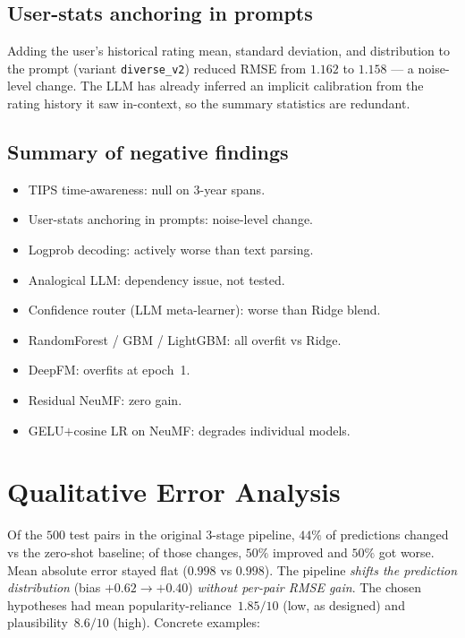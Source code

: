 \documentclass[11pt,a4paper]{article}
\begin{document}
\subsection{User-stats anchoring in prompts}
Adding the user's historical rating mean, standard deviation, and
distribution to the prompt (variant \texttt{diverse\_v2}) reduced RMSE
from $1.162$ to $1.158$ --- a noise-level change. The LLM has already
inferred an implicit calibration from the rating history it saw in-context,
so the summary statistics are redundant.

\subsection{Summary of negative findings}
\begin{itemize}[leftmargin=1.5em,itemsep=1pt]
\item TIPS time-awareness: null on 3-year spans.
\item User-stats anchoring in prompts: noise-level change.
\item Logprob decoding: actively worse than text parsing.
\item Analogical LLM: dependency issue, not tested.
\item Confidence router (LLM meta-learner): worse than Ridge blend.
\item RandomForest / GBM / LightGBM: all overfit vs Ridge.
\item DeepFM: overfits at epoch~1.
\item Residual NeuMF: zero gain.
\item GELU$+$cosine LR on NeuMF: degrades individual models.
\end{itemize}

\section{Qualitative Error Analysis}
\label{sec:qualitative}

Of the $500$ test pairs in the original 3-stage pipeline, $44\%$ of
predictions changed vs the zero-shot baseline; of those changes, $50\%$
improved and $50\%$ got worse. Mean absolute error stayed flat ($0.998$ vs
$0.998$). The pipeline \emph{shifts the prediction distribution}
(bias $+0.62 \to +0.40$) \emph{without per-pair RMSE gain}. The chosen
hypotheses had mean popularity-reliance~$1.85/10$ (low, as designed) and
plausibility~$8.6/10$ (high). Concrete examples:
\end{document}
